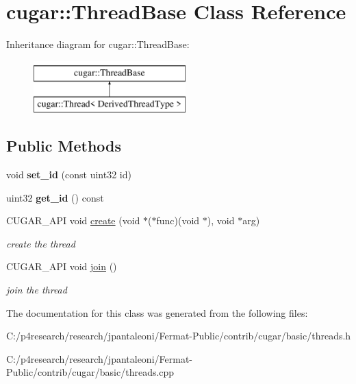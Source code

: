 \hypertarget{classcugar_1_1_thread_base}{}\section{cugar\+:\+:Thread\+Base Class Reference}
\label{classcugar_1_1_thread_base}
Inheritance diagram for cugar\+:\+:Thread\+Base\+:\begin{figure}[H]
\begin{center}
\leavevmode
\includegraphics[height=2.000000cm]{classcugar_1_1_thread_base}
\end{center}
\end{figure}
\subsection*{Public Methods}
\begin{DoxyCompactItemize}
\item 
\mbox{\label{classcugar_1_1_thread_base_aa6687a468dda5e2f87abeb2ad4377399}} 
void {\bfseries set\+\_\+id} (const uint32 id)
\item 
\mbox{\label{classcugar_1_1_thread_base_ae72e20d42ce8360a400eec63972a448e}} 
uint32 {\bfseries get\+\_\+id} () const
\item 
\mbox{\label{classcugar_1_1_thread_base_afa0d4ff230e446f8a37a100889f129c2}} 
C\+U\+G\+A\+R\+\_\+\+A\+PI void \hyperlink{classcugar_1_1_thread_base_afa0d4ff230e446f8a37a100889f129c2}{create} (void $\ast$($\ast$func)(void $\ast$), void $\ast$arg)
\begin{DoxyCompactList}\small\item\em create the thread \end{DoxyCompactList}\item 
\mbox{\label{classcugar_1_1_thread_base_af93232f304f87110b7d9cf54c53a3c11}} 
C\+U\+G\+A\+R\+\_\+\+A\+PI void \hyperlink{classcugar_1_1_thread_base_af93232f304f87110b7d9cf54c53a3c11}{join} ()
\begin{DoxyCompactList}\small\item\em join the thread \end{DoxyCompactList}\end{DoxyCompactItemize}


The documentation for this class was generated from the following files\+:\begin{DoxyCompactItemize}
\item 
C\+:/p4research/research/jpantaleoni/\+Fermat-\/\+Public/contrib/cugar/basic/threads.\+h\item 
C\+:/p4research/research/jpantaleoni/\+Fermat-\/\+Public/contrib/cugar/basic/threads.\+cpp\end{DoxyCompactItemize}
